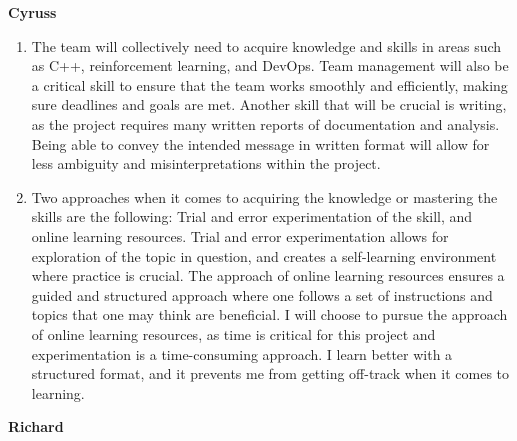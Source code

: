 \documentclass[12pt]{article}
\begin{document}
\textbf{Cyruss}


\begin{enumerate}

  \item The team will collectively need to acquire knowledge and skills in areas such as C++, reinforcement learning, and DevOps. Team management will also be a critical skill to ensure that the team works smoothly and efficiently, making sure deadlines and goals are met. Another skill that will be crucial is writing, as the project requires many written reports of documentation and analysis. Being able to convey the intended message in written format will allow for less ambiguity and misinterpretations within the project.

  
  
  \item   Two approaches when it comes to acquiring the knowledge or mastering the skills are the following: Trial and error experimentation of the skill, and online learning resources. Trial and error experimentation allows for exploration of the topic in question, and creates a self-learning environment where practice is crucial. The approach of online learning resources ensures a guided and structured approach where one follows a set of instructions and topics that one may think are beneficial. I will choose to pursue the approach of online learning resources, as time is critical for this project and experimentation is a time-consuming approach. I learn better with a structured format, and it prevents me from getting off-track when it comes to learning.
  
  \end{enumerate}

\textbf{Richard}
\end{document}
